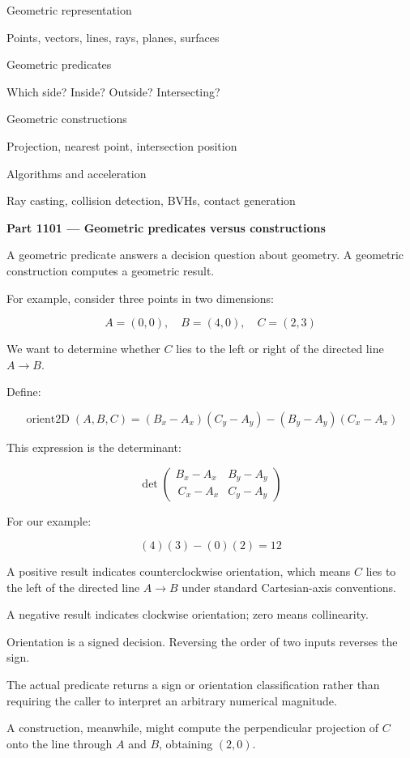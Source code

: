 Geometric representation

Points, vectors, lines, rays, planes, surfaces

Geometric predicates

Which side? Inside? Outside? Intersecting?

Geometric constructions

Projection, nearest point, intersection position

Algorithms and acceleration

Ray casting, collision detection, BVHs, contact generation

\textbf{Part 1101 --- Geometric predicates versus constructions}

A geometric predicate answers a decision question about geometry. A geometric construction computes a geometric result.

For example, consider three points in two dimensions:

\[
A=(0,0),\quad B=(4,0),\quad C=(2,3)
\]

We want to determine whether \(C\) lies to the left or right of the directed line \(A\rightarrow B\).

Define:

\[
\operatorname{orient2D}(A,B,C)= (B_x-A_x)(C_y-A_y) - (B_y-A_y)(C_x-A_x)
\]

This expression is the determinant:

\[
\det \begin{pmatrix} B_x-A_x & B_y-A_y\\\ C_x-A_x & C_y-A_y \end{pmatrix}
\]

For our example:

\[
(4)(3)-(0)(2)=12
\]

A positive result indicates counterclockwise orientation, which means \(C\) lies to the left of the directed line \(A\rightarrow B\) under standard Cartesian-axis conventions.

A negative result indicates clockwise orientation; zero means collinearity.

Orientation is a signed decision. Reversing the order of two inputs reverses the sign.

The actual predicate returns a sign or orientation classification rather than requiring the caller to interpret an arbitrary numerical magnitude.

A construction, meanwhile, might compute the perpendicular projection of \(C\) onto the line through \(A\) and \(B\), obtaining \((2,0)\).

